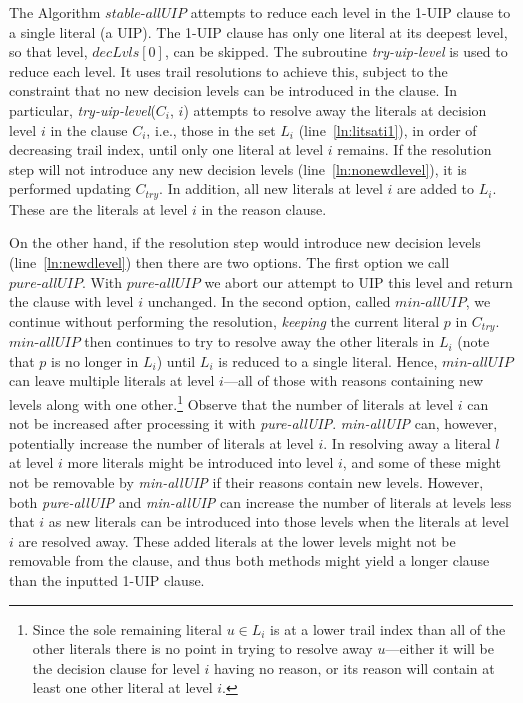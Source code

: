 \documentclass[runningheads]{llncs}
\newcommand{\allUip}{\textit{stable-allUIP}}
\newcommand{\tryuiplevel}{\textit{try-uip-level}\xspace}
\newcommand{\allUipPure}{\textit{pure-allUIP}\xspace}
\newcommand{\allUipMin}{\textit{min-allUIP}\xspace}
\newcommand{\dlevels}{\ensuremath{\mathit{decLvls}}}
\newcommand{\ctry}{C_{\mathit{try}}}
\begin{document}
The Algorithm $\allUip$ attempts to reduce each level in the 1-UIP
clause to a single literal (a UIP). The 1-UIP clause has only one
literal at its deepest level, so that level, $\dlevels[0]$, can be
skipped. The subroutine \tryuiplevel is used to reduce each level. It
uses trail resolutions to achieve this, subject to the constraint that
no new decision levels can be introduced in the clause. In particular,
\tryuiplevel($C_i$, $i$) attempts to resolve away the literals at
decision level $i$ in the clause $C_i$, i.e., those in the set $L_i$
(line~\ref{ln:litsati1}), in order of decreasing trail index, until
only one literal at level $i$ remains. If the resolution step will not
introduce any new decision levels (line~\ref{ln:nonewdlevel}), it is
performed updating $\ctry$. In addition, all new literals at level $i$
are added to $L_i$. These are the literals at level $i$ in the reason
clause.

On the other hand, if the resolution step would introduce new decision
levels (line~\ref{ln:newdlevel}) then there are two options.  The
first option we call $\allUipPure$. With $\allUipPure$ we abort our
attempt to UIP this level and return the clause with level $i$
unchanged. In the second option, called $\allUipMin$, we continue
without performing the resolution, \textit{keeping} the current
literal $p$ in $\ctry$. $\allUipMin$ then continues to try to resolve
away the other literals in $L_i$ (note that $p$ is no longer in $L_i$)
until $L_i$ is reduced to a single literal. Hence, $\allUipMin$ can
leave multiple literals at level $i$---all of those with reasons
containing new levels along with one other.\footnote{Since the sole
  remaining literal $u\in L_i$ is at a lower trail index than all of
  the other literals  there is no point in trying to resolve away
  $u$---either it will be the decision clause for level $i$ having no
  reason, or its reason will contain at least one other literal at
  level $i$.} Observe that the number of literals at level $i$ can not
be increased after processing it with \allUipPure. \allUipMin can,
however, potentially increase the number of literals at level $i$. In
resolving away a literal $l$ at level $i$ more literals might be
introduced into level $i$, and some of these might not be removable by
\allUipMin if their reasons contain new levels. However, both
\allUipPure and \allUipMin can increase the number of literals at
levels less that $i$ as new literals can be introduced into those
levels when the literals at level $i$ are resolved away. These added
literals at the lower levels might not be removable from the clause,
and thus both methods might yield a longer clause than the inputted
1-UIP clause.
\end{document}
